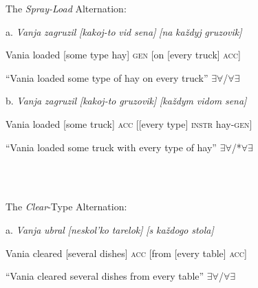 \documentclass[output=paper,modfonts, nonflat]{langsci/langscibook}
\begin{document}
         The \textit{Spray-Load} Alternation:

\begin{styleinnerExample}
a.  \textit{Vanja} \textit{zagruzil} \textit{[kakoj-to}    \textit{vid}   \textit{sena]}       \textit{[na}  \textit{každyj} \textit{gruzovik]}
\end{styleinnerExample}

\begin{styleinnerExample}
  Vania loaded   [some   type hay] \textsc{gen} [on [every  truck] \textsc{acc}]
\end{styleinnerExample}

\begin{styleinnerExample}
  “Vania loaded some type of hay on every truck” ${\exists}{\forall}$/${\forall}{\exists}$
\end{styleinnerExample}

\begin{styleinnerExample}
b.  \textit{Vanja} \textit{zagruzil} \textit{[kakoj-to} \textit{gruzovik]}    \textit{[každym} \textit{vidom}          \textit{sena]}
\end{styleinnerExample}

\begin{styleinnerExample}
  Vania loaded  [some       truck] \textsc{acc} [[every    type] \textsc{instr}  hay-\textsc{gen}]
\end{styleinnerExample}

\begin{styleinnerExample}
  “Vania loaded some truck with every type of hay” ${\exists}{\forall}$/*${\forall}{\exists}$
\end{styleinnerExample}

\ea%
    \label{ex:key:5}
    \gll\\
        \\
    \glt
    \z

         The \textit{Clear}{}-Type Alternation: 

\begin{styleinnerExample}
a.  \textit{Vanja} \textit{ubral}    \textit{[neskol’ko}  \textit{tarelok]}      \textit{[s}        \textit{každogo} \textit{stola]}
\end{styleinnerExample}

\begin{styleinnerExample}
  Vania cleared [several      dishes] \textsc{acc} [from [every      table] \textsc{acc]}
\end{styleinnerExample}

\begin{styleinnerExample}
  “Vania cleared several dishes from every table” ${\exists}{\forall}$/${\forall}{\exists}$
\end{styleinnerExample}
\end{document}
